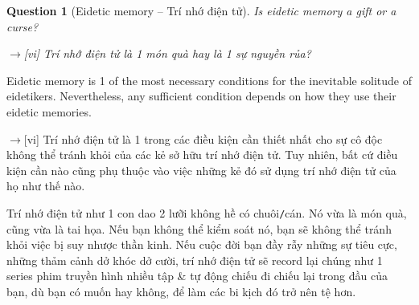 \documentclass[12pt,twoside]{book}
\newtheorem{question}{Question}
\begin{document}
\begin{question}[Eidetic memory -- Trí nhớ điện tử]
	Is eidetic memory a gift or a curse?
	
	{\sf[en]$\to$[vi]} Trí nhớ điện tử là 1 món quà hay là 1 sự nguyền rủa?
\end{question}
Eidetic memory is 1 of the most necessary conditions for the inevitable solitude of eidetikers. Nevertheless, any sufficient condition depends on how they use their eidetic memories.

{\sf[en]$\to$[vi]} Trí nhớ điện tử là 1 trong các điều kiện cần thiết nhất cho sự cô độc không thể tránh khỏi của các kẻ sở hữu trí nhớ điện tử. Tuy nhiên, bất cứ điều kiện cần nào cũng phụ thuộc vào việc những kẻ đó sử dụng trí nhớ điện tử của họ như thế nào.

Trí nhớ điện tử như 1 con dao 2 lưỡi không hề có chuôi{\tt/}cán. Nó vừa là món quà, cũng vừa là tai họa. Nếu bạn không thể kiểm soát nó, bạn sẽ không thể tránh khỏi việc bị suy nhược thần kinh. Nếu cuộc đời bạn đầy rẫy những sự tiêu cực, những thảm cảnh dở khóc dở cười, trí nhớ điện tử sẽ record lại chúng như 1 series phim truyền hình nhiều tập \& tự động chiếu đi chiếu lại trong đầu của bạn, dù bạn có muốn hay không, để làm các bi kịch đó trở nên tệ hơn.
\end{document}
